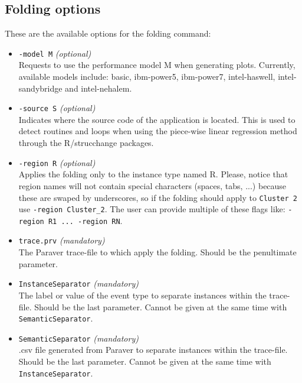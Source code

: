 

\subsection{Folding options}

These are the available options for the folding command:

\begin{itemize}

	\item \texttt{-model M} \textit{(optional)}\\
	Requests to use the performance model M when generating plots. Currently, available models include: basic, ibm-power5, ibm-power7, intel-haswell, intel-sandybridge and intel-nehalem.

	\item \texttt{-source S} \textit{(optional)}\\
	Indicates where the source code of the application is located. This is used to detect routines and loops when using the piece-wise linear regression method through the R/strucchange packages.

	\item \texttt{-region R} \textit{(optional)}\\
	Applies the folding only to the instance type named R. Please, notice that region names will not contain special characters (spaces, tabs, ...) because these are swaped by underscores, so if the folding should apply to \texttt{Cluster 2} use \texttt{-region Cluster\_2}. The user can provide multiple of these flags like: \texttt{-region R1 ... -region RN}.

	\item \texttt{trace.prv} \textit{(mandatory)}\\
	The Paraver trace-file to which apply the folding. Should be the penultimate parameter.

	\item \texttt{InstanceSeparator} \textit{(mandatory)}\\
	The label or value of the event type to separate instances within the trace-file. Should be the last parameter. Cannot be given at the same time with \texttt{SemanticSeparator}.

	\item \texttt{SemanticSeparator} \textit{(mandatory)}\\
	.csv file generated from Paraver to separate instances within the trace-file. Should be the last parameter. Cannot be given at the same time with \texttt{InstanceSeparator}.
	
\end{itemize}

